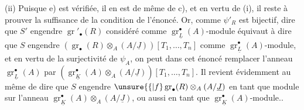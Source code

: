 (ii) Puisque e) est vérifiée, il en est de même de c), et en vertu
de (i), il reste à prouver la suffisance de la condition de l'énoncé.
Or, comme $\psi'_R$ est bijectif, dire que $S'$ engendre
$\operatorname{gr}'_\bullet(R)$ considéré comme
$\operatorname{gr}_{\underline L}^\bullet(A)$-module équivaut à dire que $S$ engendre
$(\operatorname{gr}_\bullet(R)\otimes_A(A/\underline J))[T_1,\ldots,T_n]$
comme 
$\operatorname{gr}_{\underline L}^\bullet(A)$-module, et en vertu
de la surjectivité de $\psi_A$, on peut dans cet énoncé remplacer
l'anneau $\operatorname{gr}_{\underline L}^\bullet(A)$ par
$(\operatorname{gr}_{\underline K}^\bullet(A)\otimes_A(A/\underline J))[T_1,\ldots,T_n]$.
Il revient évidemment
au même de dire que $S$ engendre
$\unsure{\{|f}\operatorname{gr}_\bullet(R)\otimes_A(A/\underline J)$ en tant que module sur
l'anneau $\operatorname{gr}_{\underline K}^\bullet(A)\otimes_A(A/\underline J)$,
ou aussi en tant que $\operatorname{gr}_{\underline K}^\bullet(A)$-module..
